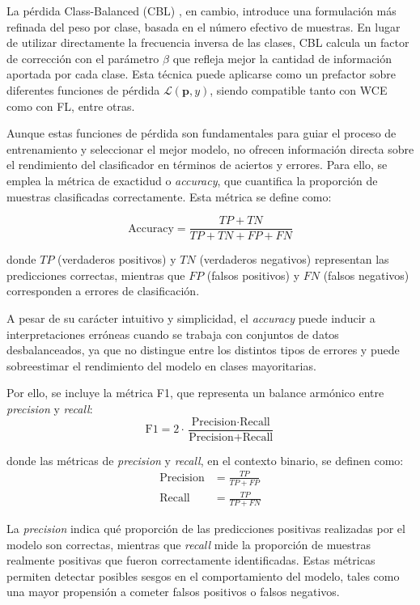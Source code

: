 La pérdida Class-Balanced (CBL) \cite{cui_class-balanced_2019}, en cambio, introduce una formulación más refinada del peso por clase, basada en el número efectivo de muestras. En lugar de utilizar directamente la frecuencia inversa de las clases, CBL calcula un factor de corrección con el parámetro $\beta$ que refleja mejor la cantidad de información aportada por cada clase. Esta técnica puede aplicarse como un prefactor sobre diferentes funciones de pérdida $\mathcal{L}(\mathbf{p}, y)$, siendo compatible tanto con WCE como con FL, entre otras.

Aunque estas funciones de pérdida son fundamentales para guiar el proceso de entrenamiento y seleccionar el mejor modelo, no ofrecen información directa sobre el rendimiento del clasificador en términos de aciertos y errores. Para ello, se emplea la métrica de exactidud o \textit{accuracy}, que cuantifica la proporción de muestras clasificadas correctamente. Esta métrica se define como:

\begin{equation}
\text{Accuracy} = \frac{TP + TN}{TP + TN + FP + FN}
\end{equation}

donde $TP$ (verdaderos positivos) y $TN$ (verdaderos negativos) representan las predicciones correctas, mientras que $FP$ (falsos positivos) y $FN$ (falsos negativos) corresponden a errores de clasificación.

A pesar de su carácter intuitivo y simplicidad, el \textit{accuracy} puede inducir a interpretaciones erróneas cuando se trabaja con conjuntos de datos desbalanceados, ya que no distingue entre los distintos tipos de errores y puede sobreestimar el rendimiento del modelo en clases mayoritarias.

Por ello, se incluye la métrica F1, que representa un balance armónico entre \textit{precision} y \textit{recall}:
\begin{equation}
    \text{F1} = 2 \cdot \frac{\text{Precision} \cdot \text{Recall}}{\text{Precision} + \text{Recall}}
\end{equation}

donde las métricas de \textit{precision} y \textit{recall}, en el contexto binario, se definen como:
\begin{align}
    \text{Precision} &= \frac{TP}{TP + FP} \\
    \text{Recall} &= \frac{TP}{TP + FN}
\end{align}

La \textit{precision} indica qué proporción de las predicciones positivas realizadas por el modelo son correctas, mientras que \textit{recall} mide la proporción de muestras realmente positivas que fueron correctamente identificadas. Estas métricas permiten detectar posibles sesgos en el comportamiento del modelo, tales como una mayor propensión a cometer falsos positivos o falsos negativos.

